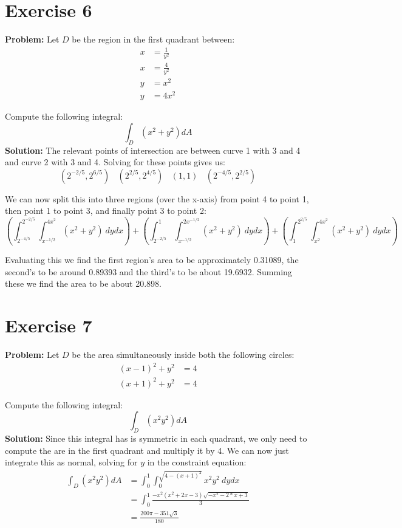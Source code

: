 \documentclass{article}
\begin{document}
\section*{Exercise 6}
\textbf{Problem:} Let $D$ be the region in the first quadrant between:
\begin{align*}
  x&=\frac{1}{y^2}\\
  x&=\frac{4}{y^2}\\
  y&=x^2\\
  y&=4x^2
\end{align*}

Compute the following integral:
$$\int_D\left(x^2+y^2\right)dA$$
\textbf{Solution:} The relevant points of intersection are between curve 1 with 3 and 4 and curve 2 with 3 and 4. Solving for these points gives us:
$$\left(2^{-2/5},2^{6/5}\right)\ \ \ \ \left(2^{2/5},2^{4/5}\right)\ \ \ \ \left(1,1\right)\ \ \ \ \left(2^{-4/5},2^{2/5}\right)$$

We can now split this into three regions (over the x-axis) from point 4 to point 1, then point 1 to point 3, and finally point 3 to point 2:
$$
  \left(\int_{2^{-4/5}}^{2^{-2/5}}\int_{x^{-1/2}}^{4x^2}(x^2+y^2)\ dydx\right)+
  \left(\int_{2^{-2/5}}^1\int_{x^{-1/2}}^{2x^{-1/2}}(x^2+y^2)\ dydx\right)+
  \left(\int_1^{2^{2/5}}\int_{x^2}^{4x^2}(x^2+y^2)\ dydx\right)
$$

Evaluating this we find the first region's area to be approximately 0.31089, the second's to be around 0.89393 and the third's to be about 19.6932. Summing these we find the area to be about 20.898.

\section*{Exercise 7}
\textbf{Problem:} Let $D$ be the area simultaneously inside both the following circles:
\begin{align*}
  (x-1)^2+y^2&=4\\
  (x+1)^2+y^2&=4
\end{align*}

Compute the following integral:
$$\int_D\left(x^2y^2\right)dA$$
\textbf{Solution:} Since this integral has is symmetric in each quadrant, we only need to compute the are in the first quadrant and multiply it by 4. We can now just integrate this as normal, solving for $y$ in the constraint equation:
\begin{align*}
  \int_D\left(x^2y^2\right)dA&=\int_0^1\int_0^{\sqrt{4-(x+1)^2}}x^2y^2\ dydx\\
  &=\int_0^1\frac{-x^2(x^2+2x-3)\sqrt{-x^2-2*x+3}}{3}\\
  &=\frac{200\pi-351\sqrt 3}{180}
\end{align*}
\end{document}
